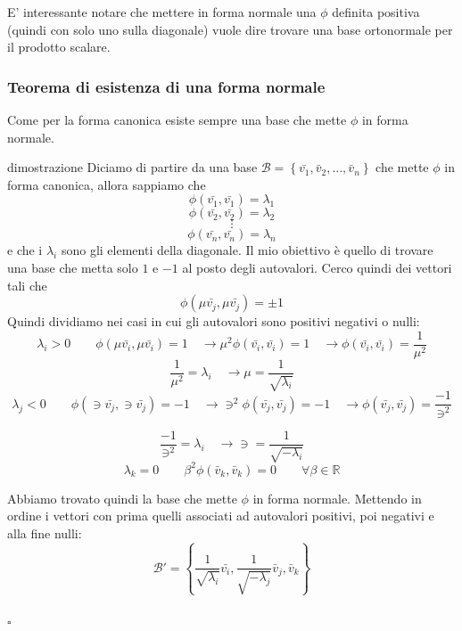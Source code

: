 \documentclass[x11names]{article}
\newcommand*{\QEDB}{\null\nobreak\hfill\ensuremath{\square}}%
\begin{document}
\noindent
E' interessante notare che mettere in forma normale una $\phi$ definita positiva (quindi con solo uno sulla diagonale) vuole dire trovare una base ortonormale per il prodotto scalare.

\begin{center}
	\colorbox{myred}{\begin{minipage}{5.75in}
			\begin{redes}{}
				\subsubsection{Teorema di esistenza di una forma normale}
				Come per la forma canonica esiste sempre una base che mette $\phi$ in forma normale.
			\end{redes}
	\end{minipage}}        
\end{center}


\begin{es}{dimostrazione}
	Diciamo di partire da una base $\mathcal{B} = \left\{\bar{v_{1}},\bar{v}_{2},\dots,\bar{v}_{n}\right\}$ che mette $\phi$ in forma canonica, allora sappiamo che 
	\[
	\phi(\bar{v_{1}},\bar{v_{1}}) = \lambda_1
	\]
	\[
	\phi(\bar{v_{2}},\bar{v_{2}}) = \lambda_2
	\]
	\[
	\vdots
	\]
	\[
	\phi(\bar{v_{n}},\bar{v_{n}}) = \lambda_n
	\]
	e che i $\lambda_i$ sono gli elementi della diagonale. Il mio obiettivo è quello di trovare una base che metta solo $1$ e $-1$ al posto degli autovalori. Cerco quindi dei vettori tali che
	\[
	\phi(\mu\bar{ v_{j}},\mu\bar{ v_{j}}) = \pm 1
	\]
	Quindi dividiamo nei casi in cui gli autovalori sono positivi negativi o nulli:
	\[
	\lambda_i > 0 \qquad  \phi(\mu\bar{v_{i}},\mu\bar{v_{i}}) =  1 \quad \to \mu^2\phi(\bar{v_{i}},\bar{v_{i}}) =  1 \quad \to \phi(\bar{v_{i}},\bar{v_{i}}) =  \frac{1}{\mu^2}
	\]
	\[
	\frac{1}{\mu^2} = \lambda_i \quad \to \mu = \frac{1}{\sqrt{\lambda_i}}
	\]
	\[
	\lambda_j < 0 \qquad  \phi(\ni\bar{v_{j}},\ni\bar{v_{j}}) =  -1 \quad \to \ni^2\phi(\bar{v_{j}},\bar{v_{j}}) =  -1 \quad \to \phi(\bar{v_{j}},\bar{v_{j}}) =  \frac{-1}{\ni^2}
	\]

	\[
	\frac{-1}{\ni^2} = \lambda_i \quad \to \ni = \frac{1}{\sqrt{-\lambda_i}}
	\]
	\[
	\lambda_k = 0 \qquad \beta^2\phi(\bar{v}_{k},\bar{v}_{k}) = 0 \qquad \forall \beta \in \mathbb{R}
	\]
\end{es}
\begin{es}{}
	Abbiamo trovato quindi la base che mette $\phi$ in forma normale. Mettendo in ordine i vettori con prima quelli associati ad autovalori positivi, poi negativi e alla fine nulli:
	\[
	\mathcal{B}' = \left\{\frac{1}{\sqrt{\lambda_i}}\bar{v_{i}},\frac{1}{\sqrt{-\lambda_j}}\bar{v}_{j},\bar{v}_{k}\right\}
	\]
	\\
	\QEDB
\end{es}
\end{document}
